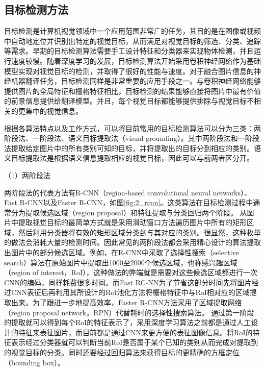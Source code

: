 
\subsection{目标检测方法}
\label{sec:2_object_detection}
目标检测是计算机视觉领域中一个应用范围非常广的任务，其目的是在图像或视频中自动地定位并识别出特定的视觉目标，从而满足对视觉目标的筛选、分类、追踪等需求。早期的目标检测算法需要手工设计特征和分类器来实现物体检测，并且运行速度较慢。随着深度学习的发展，目标检测算法开始采用卷积神经网络作为基础模型实现对视觉目标的检测，并取得了很好的性能与速度。对于融合图片信息的神经机器翻译任务，目标检测同样是非常重要的应用手段之一。与卷积神经网络能够提供图片的全局特征和栅格特征相比，目标检测的结果能够直接将图片中最有价值的前景信息提供给翻译模型。并且，每个视觉目标都能够提供排除与视觉目标不相关的更集中的视觉信息。

根据各算法特点以及工作方式，可以将目前常用的目标检测算法可以分为三类：两阶段法、一阶段法、语义目标提取法（visual grounding）。其中两阶段法和一阶段法提取给定图片中的所有类别可知的目标，并将提取出的目标分到相应的类别。语义目标提取法是根据语义信息提取相应的视觉目标，因此可以与前两者区分开。


{\sffamily （1）两阶段法}

两阶段法的代表方法有R-CNN（region-based convolutional neural networks）\cite{DBLP:conf/cvpr/GirshickDDM14}、Fast R-CNN\cite{DBLP:conf/iccv/Girshick15}以及Faster R-CNN\cite{DBLP:conf/nips/RenHGS15}，如图\ref{fig:2_rcnn}。这类算法在目标检测过程中通常分为提取候选区域（region proposal）和特征提取与分类回归两个阶段。
从图片中提取视觉目标的最简单方式就是采用滑动窗口方法遍历图片中所有的矩形区域，然后利用分类器将有效的矩形区域分类到与其对应的类别。很显然，这种枚举的做法会消耗大量的检测时间。因此常见的两阶段法都会采用精心设计的算法提取出图片中的部分候选区域。例如，在R-CNN中采取了选择性搜索（selective search）算法在原始图片中提取出1000至2000个候选区域，也称感兴趣区域（region of interest，RoI），这种做法的弊端就是需要对这些候选区域都进行一次CNN的编码，同样耗费很多时间。而Fast RC-NN为了节省这部分时间先将图片经过CNN表征后再利用其所设计的RoI池化方法将栅格特征中与RoI相对应的区域提取出来。为了跟进一步地提高效率，Faster R-CNN方法采用了区域提取网络（region proposal network，RPN）代替耗时的选择性搜索算法。
通过第一阶段的提取就可以得到每个RoI的特征表示了，采用深度学习算法之前都是通过人工设计的特征来表征图片，而目前都是通过CNN来更方便的表征图像信息。将RoI的特征表示经过分类器就可以判断当前RoI是否属于某个已知的类别从而完成对提取到的视觉目标的分类。同时还要经过回归算法来获得目标的更精确的方框定位（bounding box）。


